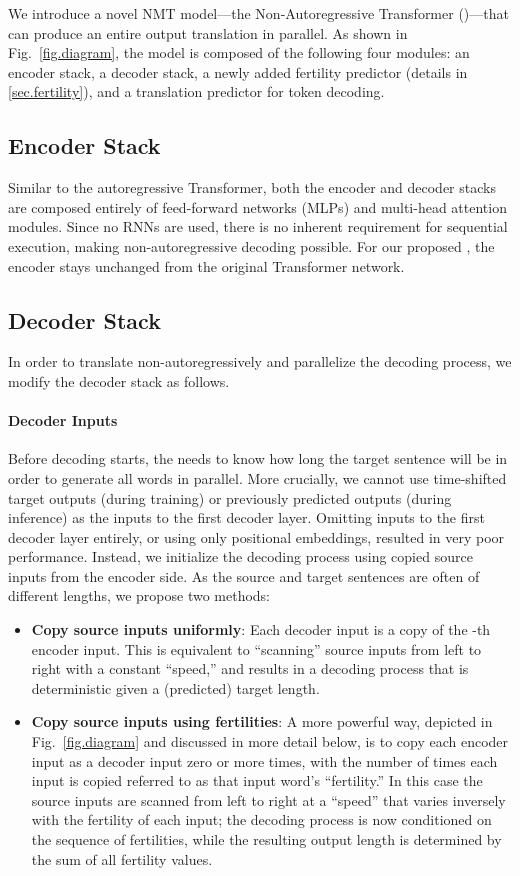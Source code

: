 \documentclass{article} \usepackage{iclr2018_conference,times}
\begin{document}
We introduce a novel NMT model---the Non-Autoregressive Transformer (\model)---that can produce an entire output translation in parallel.
As shown in Fig.~\ref{fig.diagram}, the model is composed of the following four modules: 
an encoder stack, 
a decoder stack, 
a newly added fertility predictor (details in \ref{sec.fertility}), and a translation predictor for token decoding. 


\subsection{Encoder Stack}
Similar to the autoregressive Transformer, both the encoder and decoder stacks are composed entirely of feed-forward networks (MLPs) and multi-head attention modules. Since no RNNs are used, there is no inherent requirement for sequential execution, making non-autoregressive decoding possible.
For our proposed \model{}, the encoder stays unchanged from the original Transformer network.

\subsection{Decoder Stack}\label{sec:decoderStack}
In order to translate non-autoregressively and parallelize the decoding process, we modify the decoder stack as follows.

\vspace{-5pt}
\paragraph{Decoder Inputs}
Before decoding starts, the \model{} needs to know how long the target sentence will be in order to generate all words in parallel.
More crucially, we cannot use time-shifted target outputs (during training) or previously predicted outputs (during inference) as the inputs to the first decoder layer.
Omitting inputs to the first decoder layer entirely, or using only positional embeddings, resulted in very poor performance.
Instead, we initialize the decoding process using copied source inputs from the encoder side. As the source and target sentences are often of different lengths, we propose two methods:
\begin{itemize}[leftmargin=*]
\item \textbf{Copy source inputs uniformly}: Each decoder input  is a copy of the -th encoder input. This is equivalent to ``scanning'' source inputs from left to right with a constant ``speed,'' and results in a decoding process that is deterministic given a (predicted) target length.
\item \textbf{Copy source inputs using fertilities}: A more powerful way, depicted in Fig.~\ref{fig.diagram} and discussed in more detail below, 
is to copy each encoder input as a decoder input zero or more times, with the number of times each input is copied referred to as that input word's ``fertility.''
In this case the source inputs are scanned from left to right at a ``speed'' that varies inversely with the fertility of each input; the decoding process is now conditioned on the sequence of fertilities, while the resulting output length is determined by the sum of all fertility values. 
\end{itemize}
\end{document}

